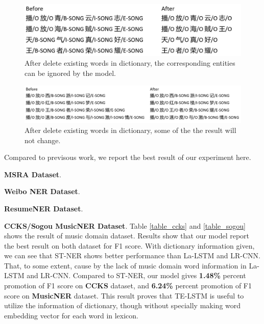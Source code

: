 \documentclass[letterpaper]{article} %
\begin{document}
\begin{figure}[t]
\centering
\includegraphics[width=0.8\columnwidth]{change_after_delete_song} %
\caption{After delete existing words in dictionary, the corresponding entities can be ignored by the model.}
\label{fig4}
\end{figure}

\begin{figure}[t]
\centering
\includegraphics[width=1.0\columnwidth]{no_change_after_delete_song} %
\caption{After delete existing words in dictionary, some of the the result will not change.}
\label{fig5}
\end{figure}

Compared to previsous work, we report the best result of our experiment here.

\textbf{MSRA Dataset}. 

\textbf{Weibo NER Dataset}. 

\textbf{ResumeNER Dataset}. 

\textbf{CCKS/Sogou MusicNER Dataset}. Table \ref{table_ccks} and \ref{table_sogou} shows the result of music domain dataset. Results show that our model report the best result on both dataset for F1 score. With dictionary information given, we can see that ST-NER shows better performance than La-LSTM and LR-CNN. That, to some extent, cause by the lack of music domain word information in La-LSTM and LR-CNN. Compared to ST-NER, our model gives \textbf{1.48\%} percent promotion of F1 score on \textbf{CCKS} dataset, and \textbf{6.24\%} percent promotion of F1 score on \textbf{MusicNER} dataset. This result proves that TE-LSTM is useful to utilize the information of dictionary, though without specially making word embedding vector for each word in lexicon.
\end{document}
